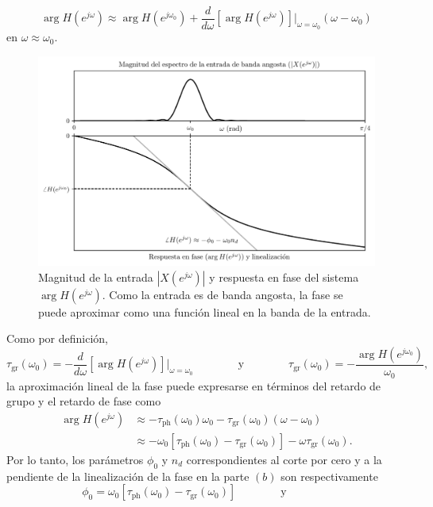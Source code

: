 \documentclass[a4paper]{report}
\begin{document}
\begin{enumerate}
 \[
  \arg{H(e^{j\omega})}\approx\arg H(e^{j\omega_0})+\frac{d}{d\omega}\left[\arg H(e^{j\omega})\right]\bigg|_{\omega=\omega_0}(\omega-\omega_0)
 \]
 en \(\omega\approx\omega_0\). 
 \begin{figure}[!htb]
 \begin{center}
 \includegraphics[width=\textwidth]{figuras/transform_analysis_group_delay_input_and_linealization.pdf}
 \caption{\label{fig:transform_analysis_group_delay_input_and_linealization} Magnitud de la entrada \(|X(e^{j\omega})|\) y respuesta en fase del sistema \(\arg H(e^{j\omega})\). Como la entrada es de banda angosta, la fase se puede aproximar como una función lineal en la banda de la entrada.}
 \end{center}
\end{figure}
 Como por definición,
 \[
  \tau_\textrm{gr}(\omega_0)=-\frac{d}{d\omega}\left[\arg H(e^{j\omega})\right]\bigg|_{\omega=\omega_0}
  \qquad\qquad\textrm{y}\qquad\qquad
  \tau_\textrm{gr}(\omega_0)=-\frac{\arg H(e^{j\omega_0})}{\omega_0},
 \]
 la aproximación lineal de la fase puede expresarse en términos del retardo de grupo y el retardo de fase como
 \begin{align*}
  \arg{H(e^{j\omega})}&\approx-\tau_\textrm{ph}(\omega_0)\omega_0-\tau_\textrm{gr}(\omega_0)(\omega-\omega_0)\\
   &\approx-\omega_0[\tau_\textrm{ph}(\omega_0)-\tau_\textrm{gr}(\omega_0)]-\omega\tau_\textrm{gr}(\omega_0).
 \end{align*}
 Por lo tanto, los parámetros \(\phi_0\) y \(n_d\) correspondientes al corte por cero y a la pendiente de la linealización de la fase en la parte \((b)\) son respectivamente
 \[
  \phi_0=\omega_0[\tau_\textrm{ph}(\omega_0)-\tau_\textrm{gr}(\omega_0)]
  \qquad\qquad\textrm{y}\qquad\qquad
\]
\end{enumerate}
\end{document}
